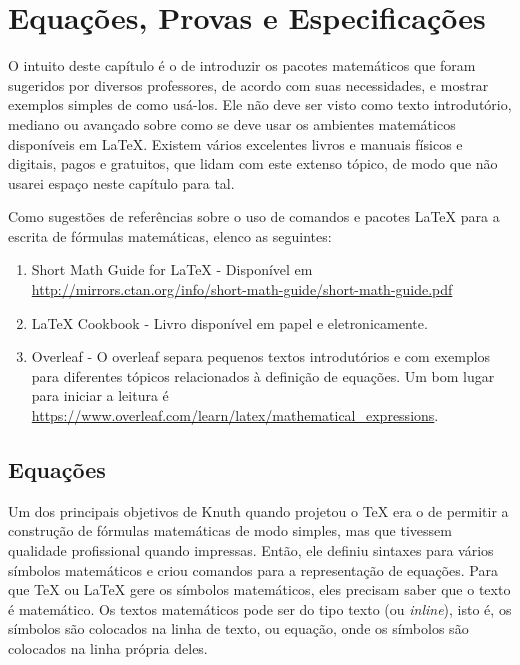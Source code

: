 

\chapter{Equações, Provas e Especificações}\label{cap:equa}

O intuito deste capítulo é o de introduzir os pacotes matemáticos que foram sugeridos por diversos professores, de acordo com suas necessidades, e mostrar exemplos simples de como usá-los. Ele não deve ser visto como texto introdutório, mediano ou avançado sobre como se deve usar os ambientes matemáticos disponíveis em \LaTeX{}. Existem vários excelentes livros e manuais físicos e digitais, pagos e gratuitos, que lidam com este extenso tópico, de modo que não usarei espaço neste capítulo para tal.

Como sugestões de referências sobre o uso de comandos e pacotes \LaTeX{} para a escrita de fórmulas matemáticas, elenco as seguintes:
\begin{enumerate}
	\item Short Math Guide for \LaTeX{} - Disponível em  \url{http://mirrors.ctan.org/info/short-math-guide/short-math-guide.pdf}
	\item \LaTeX{} Cookbook \parencite{Kottwitz2015} - Livro disponível em papel e eletronicamente.
	\item Overleaf - O \gls{overleaf} separa pequenos textos introdutórios e com exemplos para diferentes tópicos relacionados à definição de equações. Um bom lugar para iniciar a leitura é \url{https://www.overleaf.com/learn/latex/mathematical_expressions}.
\end{enumerate}

\section{Equações}

Um dos principais objetivos de Knuth quando projetou o \TeX{} era o de permitir a construção de fórmulas matemáticas de modo simples, mas que tivessem qualidade profissional quando impressas. Então, ele definiu sintaxes para vários símbolos matemáticos e criou comandos para a representação de equações. 
Para que \TeX{} ou \LaTeX{} gere os símbolos matemáticos, eles precisam saber que o texto é matemático. Os textos matemáticos pode ser do tipo texto (ou \textit{inline}), isto é, os símbolos são colocados na linha de texto, ou equação, onde os símbolos são colocados na linha própria deles.


